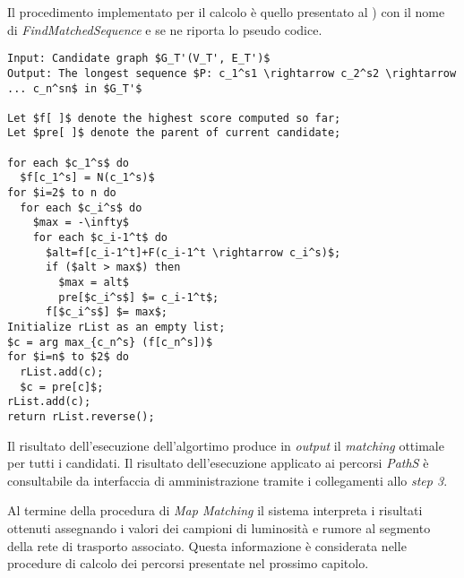 Il procedimento implementato per il calcolo è quello presentato al \cite[paragrafo 5.4]{stmapmatching}) con il nome di \emph{FindMatchedSequence} e se ne riporta lo pseudo codice.

\begin{lstlisting}[mathescape]
Input: Candidate graph $G_T'(V_T', E_T')$
Output: The longest sequence $P: c_1^s1 \rightarrow c_2^s2 \rightarrow ... c_n^sn$ in $G_T'$

Let $f[ ]$ denote the highest score computed so far;
Let $pre[ ]$ denote the parent of current candidate;

for each $c_1^s$ do
  $f[c_1^s] = N(c_1^s)$
for $i=2$ to n do
  for each $c_i^s$ do
    $max = -\infty$
    for each $c_i-1^t$ do
      $alt=f[c_i-1^t]+F(c_i-1^t \rightarrow c_i^s)$;
      if ($alt > max$) then
        $max = alt$
        pre[$c_i^s$] $= c_i-1^t$;
      f[$c_i^s$] $= max$;
Initialize rList as an empty list;
$c = arg max_{c_n^s} (f[c_n^s])$
for $i=n$ to $2$ do
  rList.add(c);
  $c = pre[c]$;
rList.add(c);
return rList.reverse();
\end{lstlisting}

Il risultato dell'esecuzione dell'algortimo produce in \emph{output} il \emph{matching} ottimale per tutti i candidati. Il risultato dell'esecuzione applicato ai percorsi \emph{PathS} è consultabile da interfaccia di amministrazione tramite i collegamenti allo \emph{step 3}.

Al termine della procedura di \emph{Map Matching} il sistema interpreta i risultati ottenuti assegnando i valori dei campioni di luminosità e rumore al segmento della rete di trasporto associato. Questa informazione è considerata nelle procedure di calcolo dei percorsi presentate nel prossimo capitolo.
